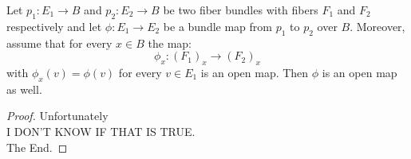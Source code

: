 

\begin{lemma}\label{lem:open_fiberwise}
Let $p_1:E_1\to B$ and $p_2:E_2\to B$ be two fiber bundles with fibers $F_1$ and $F_2$ respectively and let $\phi:E_1\to E_2$ be a bundle map from $p_1$ to $p_2$ over $B$. Moreover, assume that for every $x\in B$ the map:
\[\phi_x:{\left(F_1\right)}_x\to{\left(F_2\right)}_x\]
with $\phi_x(v)=\phi(v)$ for every $v\in E_1$ is an open map. Then $\phi$ is an open map as well.
\end{lemma}
\begin{proof}
Unfortunately\\[3em]
I DON'T KNOW IF THAT IS TRUE.\\[3em]
The End.
\end{proof}


